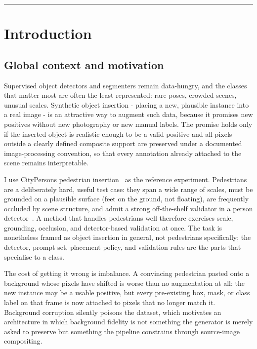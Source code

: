 \documentclass[11pt,a4paper]{article}
\begin{document}
\vspace{0.65em}
\noindent\rule{\textwidth}{0.45pt}
\vspace{0.60em}

\section{Introduction}\label{sec:intro}

\subsection*{Global context and motivation}
Supervised object detectors and segmenters remain data-hungry, and the classes
that matter most are often the least represented: rare poses, crowded scenes,
unusual scales. Synthetic object insertion - placing a new, plausible
instance into a real image - is an attractive way to augment such data, because
it promises new positives without new photography or new manual labels. The
promise holds only if the inserted object is realistic enough to be a valid
positive and all pixels outside a clearly defined composite support are preserved
under a documented image-processing convention, so that every annotation already
attached to the scene remains interpretable.

I use CityPersons pedestrian insertion~\cite{citypersons} as the reference
experiment. Pedestrians are a deliberately hard, useful test case: they span a
wide range of scales, must be grounded on a plausible surface (feet on the
ground, not floating), are frequently occluded by scene structure, and admit a
strong off-the-shelf validator in a person detector~\cite{yolov8}. A method that
handles pedestrians well therefore exercises scale, grounding, occlusion, and
detector-based validation at once. The task is nonetheless framed as object
insertion in general, not pedestrians specifically; the detector, prompt set,
placement policy, and validation rules are the parts that specialise to a class.

The cost of getting it wrong is imbalance. A convincing pedestrian pasted onto a
background whose pixels have shifted is worse than no augmentation at all: the new
instance may be a usable positive, but every pre-existing box, mask, or class
label on that frame is now attached to pixels that no longer match it. Background
corruption silently poisons the dataset, which motivates an architecture in which
background fidelity is not something the generator is merely asked to preserve but
something the pipeline constrains through source-image compositing.
\end{document}
